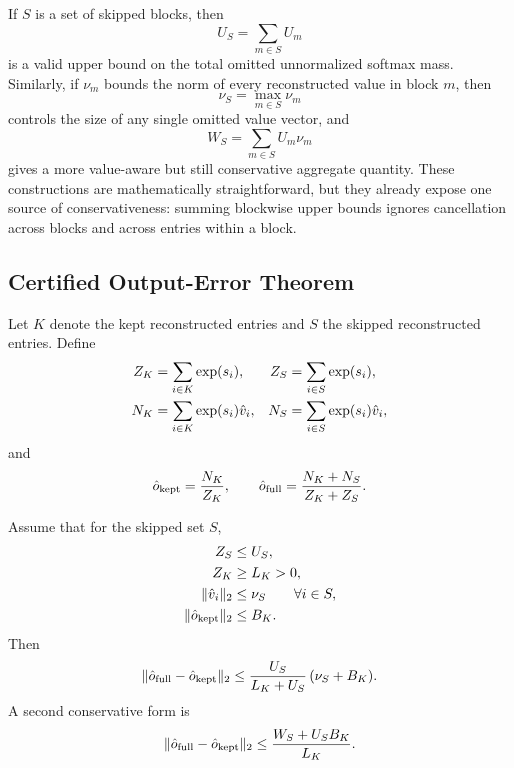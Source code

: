 If \(S\) is a set of skipped blocks, then
\begin{equation}
  U_S = \sum_{m \in S} U_m
\end{equation}
is a valid upper bound on the total omitted unnormalized softmax mass. Similarly, if \(\nu_m\) bounds the norm of every reconstructed value in block \(m\), then
\begin{equation}
  \nu_S = \max_{m \in S} \nu_m
\end{equation}
controls the size of any single omitted value vector, and
\begin{equation}
  W_S = \sum_{m \in S} U_m \nu_m
\end{equation}
gives a more value-aware but still conservative aggregate quantity. These constructions are mathematically straightforward, but they already expose one source of conservativeness: summing blockwise upper bounds ignores cancellation across blocks and across entries within a block.

\subsection{Certified Output-Error Theorem}

Let \(K\) denote the kept reconstructed entries and \(S\) the skipped reconstructed entries. Define
\begin{align}
  Z_K &= \sum_{i \in K} \operatorname{exp}(s_i),
  &
  Z_S &= \sum_{i \in S} \operatorname{exp}(s_i),
  \\
  N_K &= \sum_{i \in K} \operatorname{exp}(s_i)\hat{v}_i,
  &
  N_S &= \sum_{i \in S} \operatorname{exp}(s_i)\hat{v}_i,
\end{align}
and
\begin{equation}
  \hat{o}_{\mathrm{kept}} = \frac{N_K}{Z_K},
  \qquad
  \hat{o}_{\mathrm{full}} = \frac{N_K + N_S}{Z_K + Z_S}.
\end{equation}

\begin{theorem}
  \label{thm:local}
  Assume that for the skipped set \(S\),
  \begin{align}
    Z_S &\le U_S,
    \\
    Z_K &\ge L_K > 0,
    \\
    \lVert \hat{v}_i \rVert_2 &\le \nu_S
    \qquad \forall i \in S,
    \\
    \lVert \hat{o}_{\mathrm{kept}} \rVert_2 &\le B_K.
  \end{align}
  Then
  \begin{equation}
    \lVert \hat{o}_{\mathrm{full}} - \hat{o}_{\mathrm{kept}} \rVert_2
    \le
    \frac{U_S}{L_K + U_S}\,(\nu_S + B_K).
  \end{equation}
  A second conservative form is
  \begin{equation}
    \lVert \hat{o}_{\mathrm{full}} - \hat{o}_{\mathrm{kept}} \rVert_2
    \le
    \frac{W_S + U_S B_K}{L_K}.
  \end{equation}
\end{theorem}

